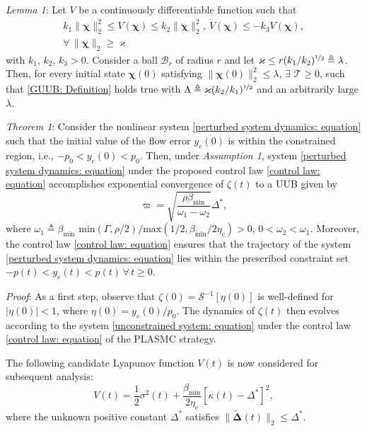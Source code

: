 \documentclass{IEEEtaes}
\begin{document}
\textit{Lemma 1}: \cite{khalil2002} Let $V$ be a continuously differentiable function such that 
\begin{align}
    k_1 \lVert \boldsymbol{\chi} \rVert^2_2 \leq V(\boldsymbol{\chi}) \leq k_2 \lVert \boldsymbol{\chi} \rVert^2_2, ~ \dot{V}(\boldsymbol{\chi}) \leq - k_3 V(\boldsymbol{\chi}),\\ \forall \, \lVert \boldsymbol{\chi} \rVert_2 \geq \varkappa \nonumber
\end{align}
\noindent with $k_1$, $k_2$, $k_3 > 0$. Consider a ball $\mathcal{B}_r$ of radius $r$ and let $\varkappa \leq r (k_1/k_2)^{\nicefrac{1}{2}} \triangleq \lambda$.
\noindent Then, for every initial state $\boldsymbol{\chi}(0)$ satisfying $\lVert \boldsymbol{\chi}(0) \rVert^2_2 \leq \lambda$, $\exists$ $\mathcal{T} \geq 0$, such that \eqref{GUUB: Definition} holds true with $\Lambda \triangleq \varkappa (k_2/k_1)^{\nicefrac{1}{2}}$ and an arbitrarily large $\lambda$. 

\textit{Theorem 1}: Consider the nonlinear system \eqref{perturbed system dynamics: equation} such that the initial value of the flow error $y_e(0)$ is within the constrained region, i.e., ${-}p_0 < y_e(0) < p_0$. Then, under \textit{Assumption 1}, system \eqref{perturbed system dynamics: equation} under the proposed control law \eqref{control law: equation} accomplishes exponential convergence of $\zeta(t)$ to a UUB given by
\begin{equation}
    \varpi = \sqrt{\frac{\rho\beta_{\text{min}}}{\omega_1 {-} \omega_2}}\Delta^{*},
\end{equation}
where $\omega_1 \triangleq \beta_{\text{min}} \text{ min}(\Gamma,\rho/2)/\text{max}(1/2,\beta_{\text{min}}/2 \eta_{\text{c}})>0$, $0<\omega_2<\omega_1$. Moreover, the control law \eqref{control law: equation} ensures that the trajectory of the system \eqref{perturbed system dynamics: equation} lies within the prescribed constraint set ${-}p(t) < y_e(t) < p(t) \, \forall \, t \geq 0$.

\textit{Proof}: As a first step, observe that $\zeta(0) = \mathcal{S}^{-1} [\eta(0)]$ is well-defined for $\lvert \eta(0) \rvert < 1$, where $\eta(0) = y_e(0)/p_0$. The dynamics of $\zeta(t)$ then evolves according to the system \eqref{unconstrained system: equation} under the control law \eqref{control law: equation} of the PLASMC strategy.

\noindent The following candidate Lyapunov function $V(t)$ is now considered for subsequent analysis:
\begin{equation} \label{Lyapunov: equation}
    V(t) = \frac{1}{2}\sigma^2(t) + \frac{\beta_{\text{min}}}{2\eta_{\text{c}}} \left[\kappa(t) {-} \Delta^{*}\right]^2,
\end{equation}
where the unknown positive constant $\Delta^{*}$ satisfies $\lVert\tilde{\boldsymbol{\Delta}}(t)\rVert_2\leq\Delta^{*}$.
\end{document}

